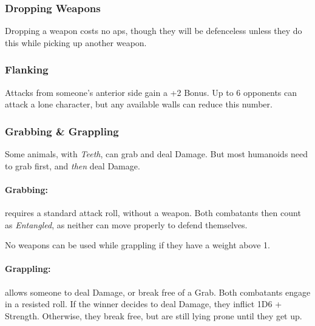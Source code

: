 \begin{multicols}{2}
\subsubsection[Dropping Weapon -- Cost: 0 \gls{ap}]{Dropping Weapons}

Dropping a weapon costs no \glspl{ap}, though they will be defenceless unless they do this while picking up another weapon.


\subsubsection[Flanking: Gain +2 to attack]{Flanking}\label{flank}

Attacks from someone's anterior side gain a +2 Bonus.
Up to 6 opponents can attack a lone character, but any available walls can reduce this number.

\subsubsection{Grabbing \& Grappling}
\label{grappling}
Some animals, with \textit{Teeth}, can grab and deal Damage.
But most humanoids need to grab first, and \emph{then} deal Damage.

\paragraph[Grabs: Make an attack without any weapon bonus. Both combatants are \textit{Entangled}. Cost: 1 \gls{ap}]{Grabbing:}
requires a standard attack roll, without a weapon.
Both combatants then count as \textit{Entangled}, as neither can move properly to defend themselves.
\label{grab}

No weapons can be used while grappling if they have a \gls{weight} above 1.

\paragraph[Grapple: Make an opposted roll of Strength + Combat.  Success means the combatant can either break free or inflict Damage.  Cost: 3 \gls{ap}]{Grappling:}
allows someone to deal Damage, or break free of a Grab.
Both combatants engage in a resisted  roll.
If the winner decides to deal Damage, they inflict 1D6 + Strength.
Otherwise, they break free, but are still lying prone until they get up.
\label{grapple}


\end{multicols}
